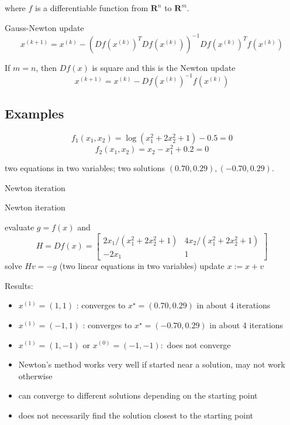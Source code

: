 where $ f $ is a differentiable function from $ \mathbf{R}^{n} $ to $ \mathbf{R}^{m} $.

Gauss-Newton update
$$
x^{(k+1)}=x^{(k)}-\left(D f\left(x^{(k)}\right)^{T} D f\left(x^{(k)}\right)\right)^{-1} D f\left(x^{(k)}\right)^{T} f\left(x^{(k)}\right)
$$

If $ m=n $, then $ D f(x) $ is square and this is the Newton update
$$
x^{(k+1)}=x^{(k)}-D f\left(x^{(k)}\right)^{-1} f\left(x^{(k)}\right)
$$

\subsection{Examples}

\begin{example}
    $$ f_{1}\left(x_{1}, x_{2}\right)=\log \left(x_{1}^{2}+2 x_{2}^{2}+1\right)-0.5=0 $$
$$ f_{2}\left(x_{1}, x_{2}\right)=x_{2}-x_{1}^{2}+0.2=0 $$

two equations in two variables; two solutions $ (0.70,0.29),(-0.70,0.29) $.

Newton iteration

\begin{algorithm}[htbp]
    \caption{Newton iteration}
    evaluate $ g=f(x) $ and
$$
H=D f(x)=\left[\begin{array}{cc}
2 x_{1} /\left(x_{1}^{2}+2 x_{2}^{2}+1\right) & 4 x_{2} /\left(x_{1}^{2}+2 x_{2}^{2}+1\right) \\
-2 x_{1} & 1
\end{array}\right]
$$\;
solve $ H v=-g $ (two linear equations in two variables)\;
update $ x:=x+v $\;
\end{algorithm}


Results: 

\begin{itemize}
    \item $ x^{(1)}=(1,1) $ : converges to $ x^{\star}=(0.70,0.29) $ in about 4 iterations
    \item $ x^{(1)}=(-1,1) $ : converges to $ x^{\star}=(-0.70,0.29) $ in about 4 iterations
    \item $ x^{(1)}=(1,-1) $ or $ x^{(0)}=(-1,-1): $ does not converge
\end{itemize}

\end{example}

\begin{itemize}
    \item Newton's method works very well if started near a solution, may not work otherwise
    \item can converge to different solutions depending on the starting point
    \item does not necessarily find the solution closest to the starting point
\end{itemize}

